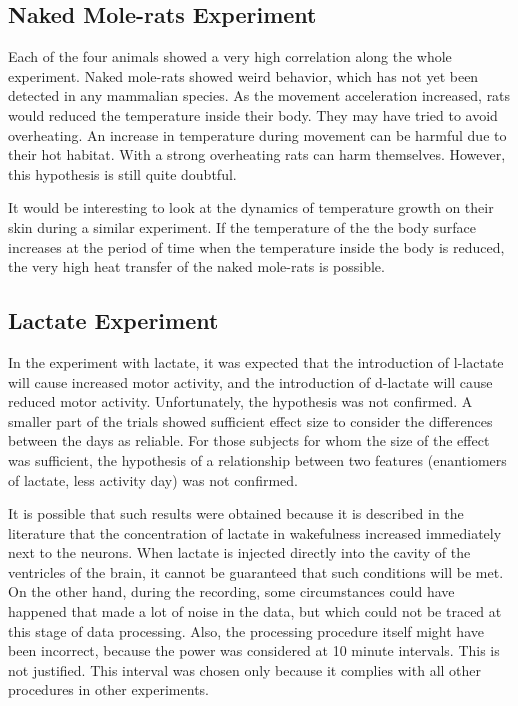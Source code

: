 \documentclass[14pt,a4paper]{scrartcl}
\begin{document}
\subsection{Naked Mole-rats Experiment}
\label{sec:Conclusions:Naked Mole-rats Experiment}

Each of the four animals showed a very high correlation along the whole experiment. Naked mole-rats showed weird behavior, which has not yet been detected in any mammalian species. As the movement acceleration increased, rats would reduced the temperature inside their body. They may have tried to avoid overheating. An increase in temperature during movement can be harmful due to their hot habitat. With a strong overheating rats can harm themselves. However, this hypothesis is still quite doubtful.

It would be interesting to look at the dynamics of temperature growth on their skin during a similar experiment. If the temperature of the the body surface increases at the period of time when the temperature inside the body is reduced, the very high heat transfer of the naked mole-rats is possible.

\subsection{Lactate Experiment}
\label{sec:Conclusions:Lactate Experiment}

In the experiment with lactate, it was expected that the introduction of l-lactate will cause increased motor activity, and the introduction of d-lactate will cause reduced motor activity. Unfortunately, the hypothesis was not confirmed. A smaller part of the trials showed sufficient effect size to consider the differences between the days as reliable. For those subjects for whom the size of the effect was sufficient, the hypothesis of a relationship between two features (enantiomers of lactate, less activity day) was not confirmed. 

It is possible that such results were obtained because it is described in the literature that the concentration of lactate in wakefulness increased immediately next to the neurons. When lactate is injected directly into the cavity of the ventricles of the brain, it cannot be guaranteed that such conditions will be met. On the other hand, during the recording, some circumstances could have happened that made a lot of noise in the data, but which could not be traced at this stage of data processing. Also, the processing procedure itself might have been incorrect, because the power was considered at 10 minute intervals. This is not justified. This interval was chosen only because it complies with all other procedures in other experiments.
\end{document}
